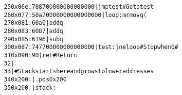 \begin{alltt}
{\scriptsize \textcolor{linenumcolor}{ 25}} 0x06e: 708700000000000000   |   jmp     test         # Goto test
{\scriptsize \textcolor{linenumcolor}{ 26}} 0x077: 50a70000000000000000 | loop:     mrmovq (%rdi),%r10   # Get *start\setcounter{codelineno}{25}\refstepcounter{codelineno}\label{line:sim:asum:loopstart}
{\scriptsize \textcolor{linenumcolor}{ 27}} 0x081: 60a0                 |   addq %r10,%rax       # Add to sum\setcounter{codelineno}{26}\refstepcounter{codelineno}\label{line:sim:asum:addq}
{\scriptsize \textcolor{linenumcolor}{ 28}} 0x083: 6087                 |   addq %r8,%rdi        # start++\setcounter{codelineno}{27}\refstepcounter{codelineno}\label{line:sim:asum:addq2}
{\scriptsize \textcolor{linenumcolor}{ 29}} 0x085: 6196                 |   subq %r9,%rsi        # count--.  Set CC\setcounter{codelineno}{28}\refstepcounter{codelineno}\label{line:sim:asum:subq}
{\scriptsize \textcolor{linenumcolor}{ 30}} 0x087: 747700000000000000   | test:     jne    loop          # Stop when 0 #\setcounter{codelineno}{29}\label{line:sim:asum:loopend}
{\scriptsize \textcolor{linenumcolor}{ 31}} 0x090: 90                   |   ret                  # Return
{\scriptsize \textcolor{linenumcolor}{ 32}}                             |
{\scriptsize \textcolor{linenumcolor}{ 33}}                             | # Stack starts here and grows to lower addresses
{\scriptsize \textcolor{linenumcolor}{ 34}} 0x200:                      |   .pos 0x200
{\scriptsize \textcolor{linenumcolor}{ 35}} 0x200:                      | stack:
\end{alltt}
